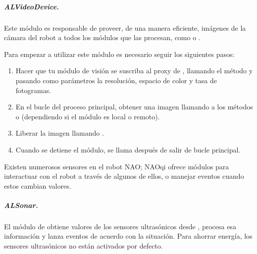 \subparagraph{ALVideoDevice.}
\label{\detokenize{chapter_one/naoqi:alvideodevice}}
Este módulo es responsable de proveer, de una manera eficiente, imágenes de la
cámara del robot a todos los módulos que las procesan, como 
o .


Para empezar a utilizar este módulo es necesario seguir los siguientes pasos:
\begin{enumerate}
\item {} 
Hacer que tu módulo de visión se suscriba al proxy de , llamando el método  y pasando como parámetros la resolución, espacio de color y tasa de fotogramas.

\item {} 
En el bucle del proceso principal, obtener una imagen llamando a los métodos  o  (dependiendo si el módulo es local o remoto).

\item {} 
Liberar la imagen llamando .

\item {} 
Cuando se detiene el módulo, se llama  después de salir de bucle principal.

\end{enumerate}

Existen numerosos sensores en el robot NAO; NAOqi ofrece módulos para interactuar
con el robot a través de algunos de ellos, o manejar eventos cuando estos
cambian valores.


\subparagraph{ALSonar.}
\label{\detokenize{chapter_one/naoqi:alsonar}}
El módulo de  obtiene valores de los sensores ultrasónicos desde
, procesa esa información y lanza eventos de acuerdo con la situación.
Para ahorrar energía, los sensores ultrasónicos no están activados por defecto.

